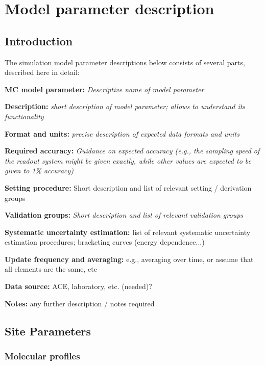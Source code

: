 \section{Model parameter description}

\subsection{Introduction}

The simulation model parameter descriptions below consists of several parts, described here in detail:

\textbf{MC model parameter:} \textit{Descriptive name of model parameter}

\textbf{Description:} \textit{short description of model parameter; allows to understand its functionality}

\textbf{Format and units:} \textit{precise description of expected data formats and units}

\textbf{Required accuracy:} \textit{Guidance on expected accuracy (e.g., the sampling speed of the readout system might be given exactly, while other values are expected to be given to 1\% accuracy)}

\textbf{Setting procedure:}
Short description and list of relevant setting / derivation groups

\textbf{Validation groups:} \textit{Short description and list of relevant validation groups}

\textbf{Systematic uncertainty estimation:}
list of relevant systematic uncertainty estimation procedures; bracketing curves (energy dependence...) 

\textbf{Update frequency and averaging:}
e.g., averaging over time, or assume that all elements are the same, etc

\textbf{Data source:}
ACE, laboratory, etc. (needed)?

\textbf{Notes:}
 any further description / notes required



\subsection{Site Parameters}

\subsubsection{Molecular profiles}

